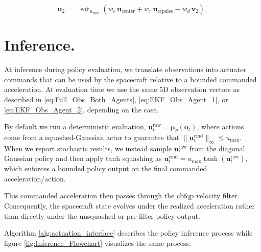 \[
\boxed{
\mathbf{u}_2 \;=\; \operatorname{sat}_{u_{\max}}\!\left(
w_c\,\mathbf{u}_{\text{center}} + w_r\,\mathbf{u}_{\text{repulse}} - w_d\,\mathbf{v}_2\right)},
\]











\section{Inference.}
\label{sec:inference}
At inference during policy evaluation, we translate observations into actuator commands that can be used by the spacecraft relative to a bounded commanded acceleration. At evaluation time we use the same 5D observation vectors as described in \ref{eq:Full_Obs_Both_Agents}, \ref{eq:EKF_Obs_Agent_1}, or \ref{eq:EKF_Obs_Agent_2}, depending on the case.

By default we run a deterministic evaluation, \(\mathbf{u}_t^{\mathrm{raw}}=\boldsymbol{\mu}_\theta(\mathbf{o}_t)\), where actions come from a squashed-Gaussian actor to guarantee that \(\|\mathbf{u}_t^{\mathrm{cmd}}\|_\infty \le u_{\max}\). When we report stochastic results, we instead sample \(\mathbf{u}_t^{\mathrm{raw}}\) from the diagonal Gaussian policy and then apply tanh squashing as \(\mathbf{u}_t^{\mathrm{cmd}}=u_{\max}\tanh\!\left(\mathbf{u}_t^{\mathrm{raw}}\right)\), which enforces a bounded policy output on the final commanded acceleration/action.

This commanded acceleration then passes through the \acs{cbfqp} velocity filter. Consequently, the spacecraft state evolves under the realized acceleration rather than directly under the unsquashed or pre-filter policy output.

Algorithm \ref{alg:actuation_interface} describes the policy inference process while figure \ref{fig:Inference_Flowchart} visualizes the same process.


